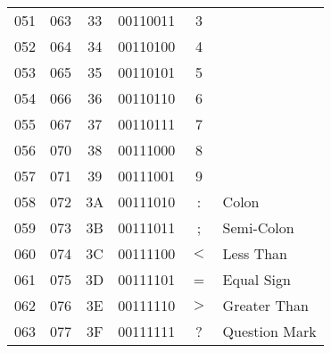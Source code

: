 \documentclass{article}
\begin{document}
\begin{longtable}{|c|c|c|c|c|l|}
       051 & 063 & 33 & 00110011 & 3   & \\
       052 & 064 & 34 & 00110100 & 4   & \\
       053 & 065 & 35 & 00110101 & 5   & \\
       054 & 066 & 36 & 00110110 & 6   & \\
       055 & 067 & 37 & 00110111 & 7   & \\
       056 & 070 & 38 & 00111000 & 8   & \\
       057 & 071 & 39 & 00111001 & 9   & \\
       058 & 072 & 3A & 00111010 & :   & Colon\\
       059 & 073 & 3B & 00111011 & ;   & Semi-Colon\\
       060 & 074 & 3C & 00111100 & $<$ & Less Than\\
       061 & 075 & 3D & 00111101 & =   & Equal Sign\\
       062 & 076 & 3E & 00111110 & $>$ & Greater Than\\
       063 & 077 & 3F & 00111111 & ?   & Question Mark\\
       
       
       

\end{longtable}
\end{document}
